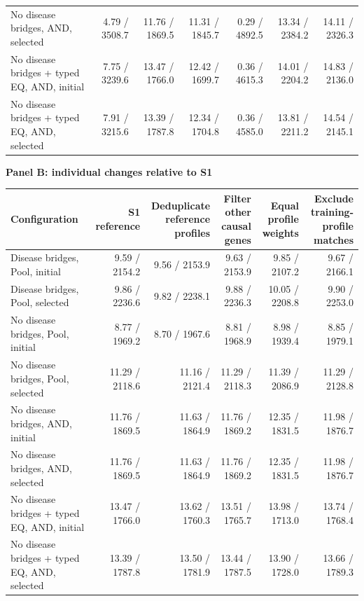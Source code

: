 \begin{landscape}
\begin{table}[p]
\begin{adjustbox}{max width=\linewidth}
\begin{tabular}{lrrrrrr}
No disease bridges, AND, selected & 4.79 / 3508.7 & 11.76 / 1869.5 & 11.31 / 1845.7 & 0.29 / 4892.5 & 13.34 / 2384.2 & 14.11 / 2326.3 \\
No disease bridges + typed EQ, AND, initial & 7.75 / 3239.6 & 13.47 / 1766.0 & 12.42 / 1699.7 & 0.36 / 4615.3 & 14.01 / 2204.2 & 14.83 / 2136.0 \\
No disease bridges + typed EQ, AND, selected & 7.91 / 3215.6 & 13.39 / 1787.8 & 12.34 / 1704.8 & 0.36 / 4585.0 & 13.81 / 2211.2 & 14.54 / 2145.1 \\
\bottomrule
\end{tabular}
\end{adjustbox}
\par\medskip
\textbf{Panel B: individual changes relative to S1}\par\smallskip
\begin{adjustbox}{max width=\linewidth}
\begin{tabular}{lrrrrr}
\toprule
Configuration & S1 reference & \shortstack{Deduplicate\\reference profiles} & \shortstack{Filter other\\causal genes} & \shortstack{Equal profile\\weights} & \shortstack{Exclude training-\\profile matches} \\
\midrule
Disease bridges, Pool, initial & 9.59 / 2154.2 & 9.56 / 2153.9 & 9.63 / 2153.9 & 9.85 / 2107.2 & 9.67 / 2166.1 \\
Disease bridges, Pool, selected & 9.86 / 2236.6 & 9.82 / 2238.1 & 9.88 / 2236.3 & 10.05 / 2208.8 & 9.90 / 2253.0 \\
No disease bridges, Pool, initial & 8.77 / 1969.2 & 8.70 / 1967.6 & 8.81 / 1968.9 & 8.98 / 1939.4 & 8.85 / 1979.1 \\
No disease bridges, Pool, selected & 11.29 / 2118.6 & 11.16 / 2121.4 & 11.29 / 2118.3 & 11.39 / 2086.9 & 11.29 / 2128.8 \\
No disease bridges, AND, initial & 11.76 / 1869.5 & 11.63 / 1864.9 & 11.76 / 1869.2 & 12.35 / 1831.5 & 11.98 / 1876.7 \\
No disease bridges, AND, selected & 11.76 / 1869.5 & 11.63 / 1864.9 & 11.76 / 1869.2 & 12.35 / 1831.5 & 11.98 / 1876.7 \\
No disease bridges + typed EQ, AND, initial & 13.47 / 1766.0 & 13.62 / 1760.3 & 13.51 / 1765.7 & 13.98 / 1713.0 & 13.74 / 1768.4 \\
No disease bridges + typed EQ, AND, selected & 13.39 / 1787.8 & 13.50 / 1781.9 & 13.44 / 1787.5 & 13.90 / 1728.0 & 13.66 / 1789.3 \\
\bottomrule
\end{tabular}
\end{adjustbox}
\end{table}
\clearpage
\end{landscape}
